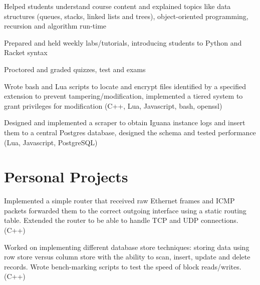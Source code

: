 \documentclass[]{deedy-resume-openfont}
\begin{document}
\begin{minipage}[t]{0.99\textwidth}
\begin{tightemize}
\item Helped students understand course content and explained topics like data structures (queues, stacks, linked lists and trees), object-oriented programming, recursion and algorithm run-time
\item Prepared and held weekly labs/tutorials, introducing students to Python and Racket syntax
\item Proctored and graded quizzes, test and exams
\end{tightemize}
\sectionsep

\begin{tightemize}
\item Wrote bash and Lua scripts to locate and encrypt files identified by a specified extension to prevent tampering/modification, implemented a tiered system to grant privileges for modification (C++, Lua, Javascript, bash, openssl)
\item Designed and implemented a scraper to obtain Iguana instance logs and insert them to a central Postgres database, designed the schema and tested performance (Lua, Javascript, PostgreSQL)
\end{tightemize}
\sectionsep


\section{Personal Projects}
\location{}
Implemented a simple router that received raw Ethernet  frames and ICMP packets forwarded them to the correct outgoing interface using a static routing table. Extended the router to be able to handle TCP and UDP connections. (C++)
\sectionsep

\location{}
Worked on implementing different database store techniques: storing data using row store versus column store with the ability to scan, insert, update and delete records. Wrote bench-marking scripts to test the speed of block reads/writes. (C++)
\sectionsep



\end{minipage}
\end{document}
